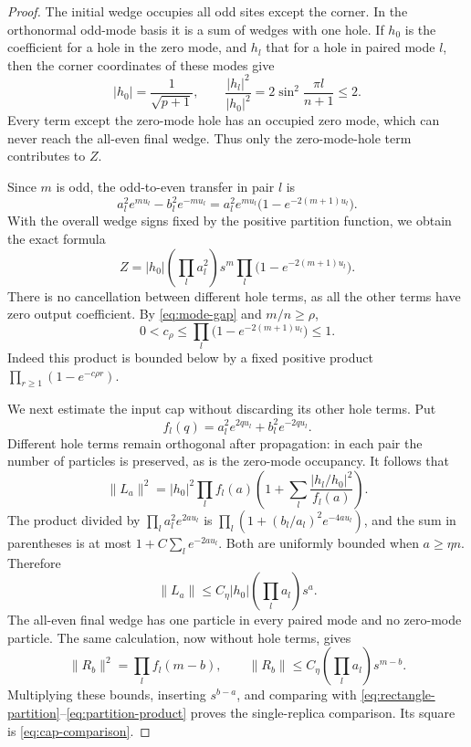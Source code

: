 \begin{proof}
The initial wedge occupies all odd sites except the corner.  In the
orthonormal odd-mode basis it is a sum of wedges with one hole.  If $h_0$
is the coefficient for a hole in the zero mode, and $h_l$ that for a
hole in paired mode $l$, then the corner coordinates of these modes give
\begin{equation}\label{eq:corner-hole}
 |h_0|=\frac1{\sqrt{p+1}},\qquad
 \frac{|h_l|^2}{|h_0|^2}
 =2\sin^2\frac{\pi l}{n+1}\le2.
\end{equation}
Every term except the zero-mode hole has an occupied zero mode, which
can never reach the all-even final wedge.  Thus only the zero-mode-hole
term contributes to $Z$.

Since $m$ is odd, the odd-to-even transfer in pair $l$ is
\[
 a_l^2e^{m u_l}-b_l^2e^{-m u_l}
 =a_l^2e^{m u_l}\bigl(1-e^{-2(m+1)u_l}\bigr).
\]
With the overall wedge signs fixed by the positive partition function,
we obtain the exact formula
\begin{equation}\label{eq:rectangle-partition}
 Z=|h_0|\left(\prod_l a_l^2\right)s^m
       \prod_l\bigl(1-e^{-2(m+1)u_l}\bigr).
\end{equation}
There is no cancellation between different hole terms, as all the other
terms have zero output coefficient.  By \eqref{eq:mode-gap} and $m/n\ge\rho$,
\begin{equation}\label{eq:partition-product}
 0<c_\rho\le
 \prod_l\bigl(1-e^{-2(m+1)u_l}\bigr)\le1.
\end{equation}
Indeed this product is bounded below by a fixed positive product
$\prod_{r\ge1}(1-e^{-c\rho r})$.

We next estimate the input cap without discarding its other hole terms.
Put
\[
 f_l(q)=a_l^2e^{2q u_l}+b_l^2e^{-2q u_l}.
\]
Different hole terms remain orthogonal after propagation: in each pair
the number of particles is preserved, as is the zero-mode occupancy.
It follows that
\begin{equation}\label{eq:left-cap-exact}
 \|L_a\|^2
 =|h_0|^2\prod_l f_l(a)
       \left(1+\sum_l\frac{|h_l/h_0|^2}{f_l(a)}\right).
\end{equation}
The product divided by
$\prod_l a_l^2 e^{2a u_l}$ is
$\prod_l(1+(b_l/a_l)^2e^{-4a u_l})$, and the sum in parentheses is at
most $1+C\sum_l e^{-2a u_l}$.  Both are uniformly bounded when
$a\ge\eta n$.  Therefore
\[
 \|L_a\|\le C_\eta |h_0|\left(\prod_l a_l\right)s^a.
\]
The all-even final wedge has one particle in every paired mode and no
zero-mode particle.  The same calculation, now without hole terms,
gives
\[
 \|R_b\|^2=\prod_l f_l(m-b),\qquad
 \|R_b\|\le C_\eta\left(\prod_l a_l\right)s^{m-b}.
\]
Multiplying these bounds, inserting $s^{b-a}$, and comparing with
\eqref{eq:rectangle-partition}--\eqref{eq:partition-product} proves the
single-replica comparison.  Its square is \eqref{eq:cap-comparison}.
\end{proof}

